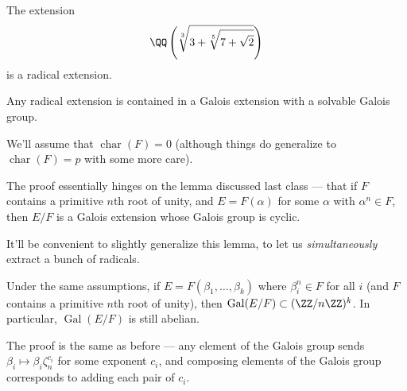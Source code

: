 \begin{example}
    The extension \[\QQ\left(\sqrt[3]{3 + \sqrt[5]{7 + \sqrt{2}}}\right)\] is a radical extension.
\end{example}

\begin{proposition} \label{radical implies solvable}
    Any radical extension is contained in a Galois extension with a solvable Galois group. 
\end{proposition}

We'll assume that $\operatorname{char}(F) = 0$ (although things do generalize to $\operatorname{char}(F) = p$ with some more care). 

The proof essentially hinges on the lemma discussed last class --- that if $F$ contains a primitive $n$th root of unity, and $E = F(\alpha)$ for some $\alpha$ with $\alpha^n \in F$, then $E/F$ is a Galois extension whose Galois group is cyclic. 

It'll be convenient to slightly generalize this lemma, to let us \emph{simultaneously} extract a bunch of radicals. 

\begin{lemma}
Under the same assumptions, if $E = F(\beta_1, \ldots, \beta_k)$ where $\beta_i^n \in F$ for all $i$ (and $F$ contains a primitive $n$th root of unity), then $\operatorname{Gal}(E/F) \subset (\ZZ/n\ZZ)^k$. In particular, $\operatorname{Gal}(E/F)$ is still abelian. 
\end{lemma}

The proof is the same as before --- any element of the Galois group sends $\beta_i \mapsto \beta_i\zeta_n^{c_i}$ for some exponent $c_i$, and composing elements of the Galois group corresponds to adding each pair of $c_i$. 

